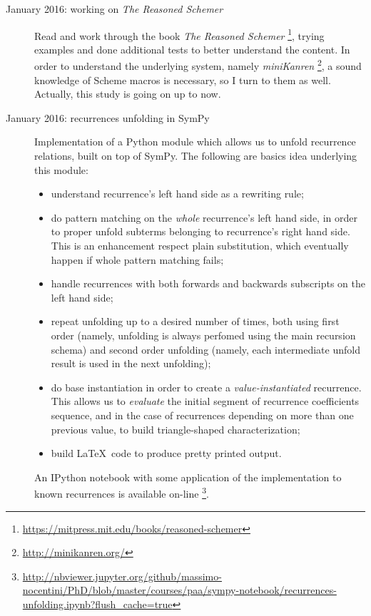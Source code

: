 \documentclass[11pt]{article}
\begin{document}
\begin{description}

\item[January 2016: working on \emph{The Reasoned Schemer}]
    Read and work through the book \emph{The Reasoned Schemer}
    \footnote{\url{https://mitpress.mit.edu/books/reasoned-schemer}}, trying examples
    and done additional tests to better understand the content.
    In order to understand the underlying system, namely \emph{miniKanren}
    \footnote{\url{http://minikanren.org/}}, a sound knowledge of Scheme macros
    is necessary, so I turn to them as well. Actually, this study is
    going on up to now.

\item[January 2016: recurrences unfolding in SymPy] 
    Implementation of a Python module which allows us to unfold
    recurrence relations, built on top of SymPy. The following are basics idea underlying
    this module:
    \begin{itemize}
        \item understand recurrence's left hand side as a rewriting rule;
        \item do pattern matching on the \emph{whole} recurrence's left hand side,
            in order to proper unfold subterms belonging to recurrence's right hand
            side. This is an enhancement respect plain substitution, which eventually
            happen if whole pattern matching fails; 
        \item handle recurrences with both forwards and backwards subscripts on the
            left hand side;
        \item repeat unfolding up to a desired number of times, both using first order
            (namely, unfolding is always perfomed using the main recursion schema)
            and second order unfolding (namely, each intermediate unfold result is used
            in the next unfolding);
        \item do base instantiation in order to create a \emph{value-instantiated}
            recurrence. This allows us to \emph{evaluate} the initial segment of
            recurrence coefficients sequence, and in the case of recurrences
            depending on more than one previous value, to build triangle-shaped characterization;
        \item build \LaTeX\, code to produce pretty printed output.
    \end{itemize}
    An IPython notebook with some application of the implementation to known recurrences is available on-line 
    \footnote{\url{http://nbviewer.jupyter.org/github/massimo-nocentini/PhD/blob/master/courses/paa/sympy-notebook/recurrences-unfolding.ipynb?flush_cache=true}}.

\end{description}
\end{document}
